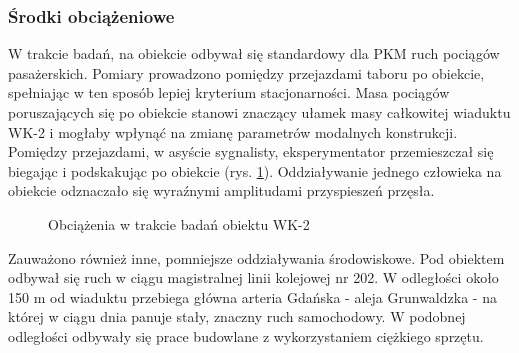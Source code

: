 \subsubsection{Środki obciążeniowe}
W trakcie badań, na obiekcie odbywał się standardowy dla PKM ruch pociągów pasażerskich. Pomiary prowadzono pomiędzy przejazdami taboru po obiekcie, spełniając w ten sposób lepiej kryterium stacjonarności. Masa pociągów poruszających się po obiekcie stanowi znaczący ułamek masy całkowitej wiaduktu WK-2 i mogłaby wpłynąć na zmianę parametrów modalnych konstrukcji. Pomiędzy przejazdami, w asyście sygnalisty, eksperymentator przemieszczał się biegając i podskakując po obiekcie (rys. \ref{fig: wk2_foto_obciazenia}). Oddziaływanie jednego człowieka na obiekcie odznaczało się wyraźnymi amplitudami przyspieszeń przęsła. 
\begin{figure}[hbt!]
	\centering
	 \quad
	\captionsetup{justification=centering}
	\caption{Obciążenia w trakcie badań obiektu WK-2}
	\label{fig: wk2_foto_obciazenia}
\end{figure}

Zauważono również inne, pomniejsze oddziaływania środowiskowe. Pod obiektem odbywał się ruch w ciągu magistralnej linii kolejowej nr 202. W odległości około 150 m od wiaduktu przebiega główna arteria Gdańska - aleja Grunwaldzka - na której w ciągu dnia panuje stały, znaczny ruch samochodowy. W podobnej odległości odbywały się prace budowlane z wykorzystaniem ciężkiego sprzętu.




